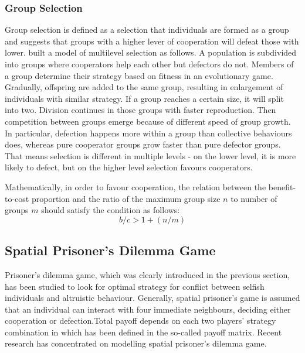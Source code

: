 \subsubsection{Group Selection}
Group selection is defined as a selection that individuals are formed as a group and suggests that groups with a higher lever of cooperation will defeat those with lower. \citet{traulsen2006evolution} built a model of multilevel selection as follows. A population is subdivided into groups where cooperators help each other but defectors do not. Members of a group determine their strategy based on fitness in an evolutionary game. Gradually, offspring are added to the same group, resulting in enlargement of individuals with similar strategy. If a group reaches a certain size, it will split into two. Division continues in those groups with faster reproduction. Then competition between groups emerge because of different speed of group growth. In particular, defection happens more within a group than collective behaviours does, whereas pure cooperator groups grow faster than pure defector groups. That means selection is different in multiple levels - on the lower level, it is more likely to defect, but on the higher level selection favours cooperators.

Mathematically, in order to favour cooperation, the relation between the benefit-to-cost proportion and the ratio of the maximum group size $n$ to number of groups $m$ should satisfy the condition as follows:
\begin{equation}\label{eq:2.5}
    b/c > 1+ (n/m)
\end{equation}
\subsection{Spatial Prisoner's Dilemma Game}
Prisoner's dilemma game, which was clearly introduced in the previous section, has been studied to look for optimal strategy for conflict between selfish individuals and altruistic behaviour. Generally, spatial prisoner's game is assumed that an individual can interact with four immediate neighbours, deciding either cooperation or defection.Total payoff depends on each two players' strategy combination in which has been defined in the so-called payoff matrix. Recent research has concentrated on modelling spatial prisoner's dilemma game.

